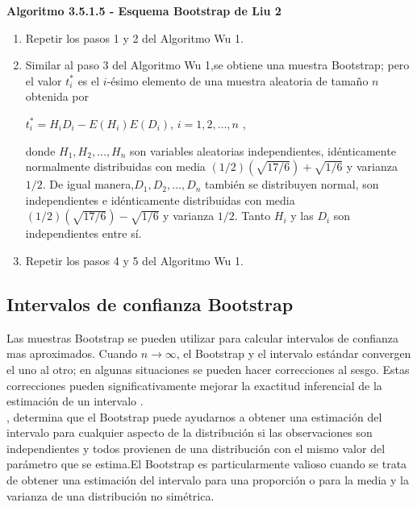\textbf{Algoritmo 3.5.1.5 - Esquema Bootstrap de Liu 2}

\begin{enumerate}
	\item Repetir los pasos 1 y 2 del Algoritmo Wu 1.
	
	\item  Similar al paso 3 del Algoritmo Wu 1,se obtiene una muestra Bootstrap;
	pero el valor $t^{*}_{i}$ es el $i$-ésimo elemento de una muestra aleatoria de tamaño $n$ obtenida por 
	
	\begin{center}
		$t^{*}_{i} = H_{i}D_{i}- E(H_{i})E(D_{i})$,\hspace{.5cm} $i = 1,2, \dots, n$ ,
	\end{center}
	
	donde $ H_{1},H_{2}, \dots,H_{n}$ son variables aleatorias independientes, idénticamente normalmente distribuidas con media $(1/2)( \sqrt{17/6})+ \sqrt{1/6}$ y varianza $1/2$. De igual manera,$ D_{1},D_{2}, \dots,D_{n}$ también se distribuyen normal, son independientes e idénticamente
	distribuidas con media $(1/2)( \sqrt{17/6})- \sqrt{1/6}$ y varianza  $1/2$. Tanto $ H_{i}$ y las $ D_{i}$ son independientes entre sí.
	
	\item Repetir los pasos 4 y 5 del Algoritmo Wu 1.
\end{enumerate}



\subsection{Intervalos de confianza Bootstrap}
Las muestras Bootstrap se pueden utilizar para calcular intervalos de confianza mas aproximados. Cuando $n \rightarrow \infty$, el Bootstrap y el intervalo estándar convergen el uno al otro; en algunas situaciones se pueden hacer correcciones al sesgo. Estas correcciones pueden significativamente mejorar la exactitud inferencial de la estimación de un intervalo \parencite{efron-tibs-1993}.\\


\textcite{good-2005}, determina que el Bootstrap puede ayudarnos a obtener una estimación del intervalo para cualquier aspecto de la distribución si las observaciones son independientes y todos provienen de una distribución con el mismo valor del parámetro que se estima.El Bootstrap es particularmente valioso cuando se trata de obtener una estimación del intervalo para una proporción o para la media y la varianza de una distribución no simétrica.\\


